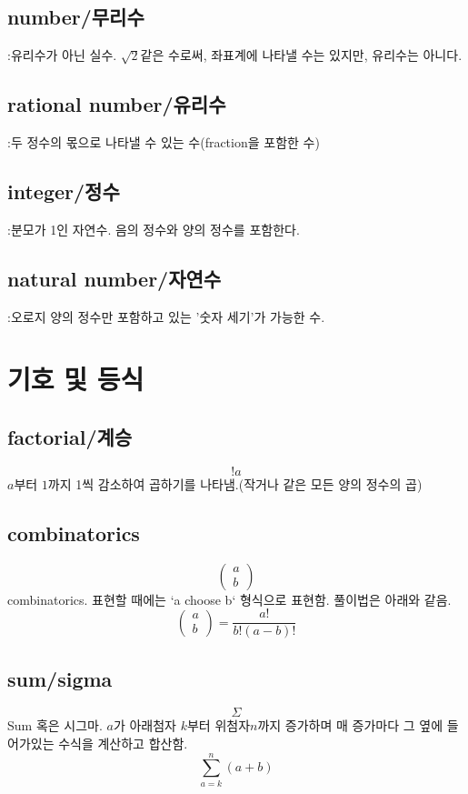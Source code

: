 \documentclass{article}
\begin{document}
\subsection{number/무리수}
:유리수가 아닌 실수. $\sqrt{2}$같은 수로써, 좌표계에 나타낼 수는 있지만, 유리수는 아니다.

\subsection{rational number/유리수}
:두 정수의 몫으로 나타낼 수 있는 수(fraction을 포함한 수)

\subsection{integer/정수}
:분모가 1인 자연수. 음의 정수와 양의 정수를 포함한다.

\subsection{natural number/자연수}
:오로지 양의 정수만 포함하고 있는 '숫자 세기'가 가능한 수.

\section{기호 및 등식}
\subsection{factorial/계승}
$$!a$$
$a$부터 $1$까지 1씩 감소하여 곱하기를 나타냄.(작거나 같은 모든 양의 정수의 곱)
\subsection{combinatorics}
$$\begin{pmatrix} a \\ b \end{pmatrix}$$
combinatorics. 표현할 때에는 `a choose b` 형식으로 표현함. 풀이법은 아래와 같음.
$$\begin{pmatrix} a\\b \end{pmatrix} = \dfrac{a!}{b!(a-b)!}$$
\subsection{sum/sigma}
$$\Sigma$$
Sum 혹은 시그마. $a$가 아래첨자 $k$부터 위첨자$n$까지 증가하며 매 증가마다 그 옆에 들어가있는 수식을 계산하고 합산함.
$$ \sum_{a=k}^{n} (a+b) $$
\end{document}
